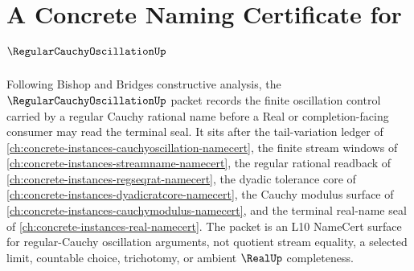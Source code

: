 \chapter{A Concrete Naming Certificate for $\RegularCauchyOscillationUp$}
\label{ch:concrete-instances-regular-cauchy-oscillation-namecert}

Following Bishop and Bridges constructive analysis, the $\RegularCauchyOscillationUp$ packet records the finite oscillation control carried by a regular Cauchy rational name before a Real or completion-facing consumer may read the terminal seal. It sits after the tail-variation ledger of \autoref{ch:concrete-instances-cauchyoscillation-namecert}, the finite stream windows of \autoref{ch:concrete-instances-streamname-namecert}, the regular rational readback of \autoref{ch:concrete-instances-regseqrat-namecert}, the dyadic tolerance core of \autoref{ch:concrete-instances-dyadicratcore-namecert}, the Cauchy modulus surface of \autoref{ch:concrete-instances-cauchymodulus-namecert}, and the terminal real-name seal of \autoref{ch:concrete-instances-real-namecert}. The packet is an L10 NameCert surface for regular-Cauchy oscillation arguments, not quotient stream equality, a selected limit, countable choice, trichotomy, or ambient $\RealUp$ completeness.

